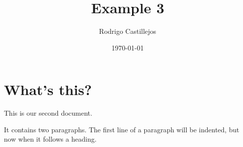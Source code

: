 \documentclass[a4paper,11pt]{article}
\begin{document}
	\title{Example 3}
	\author{Rodrigo Castillejos}
	\date{\today}
	\maketitle
	
	\section{What's this?}
	This           is     our
	second document.
	
	It contains two paragraphs. The first line of a paragraph will be indented, but now when it follows a heading.
\end{document}
